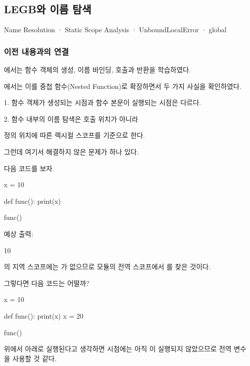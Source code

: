 

\subsection{LEGB와 이름 탐색}

Name Resolution · Static Scope Analysis · UnboundLocalError · global

\subsubsection{이전 내용과의 연결}

에서는 함수 객체의 생성, 이름 바인딩, 호출과 반환을 학습하였다.

에서는 이를 중첩 함수(Nested Function)로 확장하면서 두 가지 사실을 확인하였다.

\begin{dhksmry}
    1. 함수 객체가 생성되는 시점과 함수 본문이 실행되는 시점은 다르다.

    2. 함수 내부의 이름 탐색은 호출 위치가 아니라
       
       정의 위치에 따른 렉시컬 스코프를 기준으로 한다.
\end{dhksmry}

그런데 여기서 해결하지 않은 문제가 하나 있다.

다음 코드를 보자.

\begin{dhkcode}
x = 10

def func():
    print(x)

func()
\end{dhkcode}

예상 출력:

\begin{dhkzsh}
10
\end{dhkzsh}

의 지역 스코프에는 가 없으므로 모듈의 전역 스코프에서 를 찾은 것이다.

그렇다면 다음 코드는 어떨까?

\begin{dhkcode}
x = 10

def func():
    print(x)
    x = 20

func()
\end{dhkcode}

위에서 아래로 실행된다고 생각하면  시점에는 아직 이 실행되지 않았으므로 전역 변수 을 사용할 것 같다.

